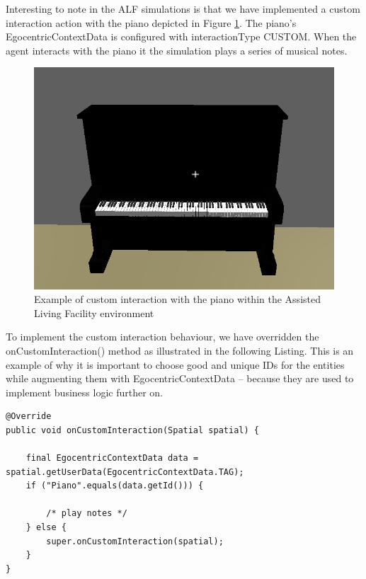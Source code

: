 Interesting to note in the ALF simulations is that we have implemented a custom interaction action with the piano depicted in Figure \ref{fig:impl_piano}. The piano's EgocentricContextData is configured with interactionType CUSTOM. When the agent interacts with the piano it the simulation plays a series of musical notes.
\begin{figure}[H]
	\centering
	\includegraphics[width=0.8\linewidth]{gfx/Chapter4/piano}
	\caption{Example of custom interaction with the piano within the Assisted Living Facility environment}
	\label{fig:impl_piano}
\end{figure}

To implement the custom interaction behaviour, we have overridden the onCustomInteraction() method as illustrated in the following Listing. This is an example of why it is important to choose good and unique IDs for the entities while augmenting them with EgocentricContextData -- because they are used to implement business logic further on.
\begin{lstlisting}[caption={Snippet of code illustrating how to implement a CUSTOM interaction with an object},label={lst:custom_interaction}]
@Override
public void onCustomInteraction(Spatial spatial) {
    
    final EgocentricContextData data = spatial.getUserData(EgocentricContextData.TAG);
    if ("Piano".equals(data.getId())) {
        
        /* play notes */
    } else {
        super.onCustomInteraction(spatial);
    }
}
\end{lstlisting}

